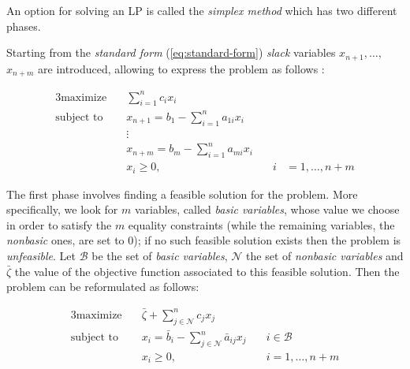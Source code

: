 An option for solving an \acrshort{LP} is called the \emph{simplex
	method} which has two different phases.

Starting from the \emph{standard form} (\autoref{eq:standard-form})
\emph{slack} variables $x_{n+1}, \dots, $ $x_{n+m} $ are introduced, allowing to express the problem as follows
\cite{Vanderbei2008,Edgar2001}:

\begin{alignat}{3}
	\label{eq:standard-form}
	\text{maximize}   \quad & \sum_{i=1}^{n} c_{i}x_{i}                                                                   \\
	\text{subject to} \quad & x_{n+1}                   = b_{1} - \sum_{i=1}^{n} a_{1i}  x_{i} &                          \\
	                        & \vdots                                                                                      \\
	                        & x_{n+m}                   = b_{m} - \sum_{i=1}^{n} a_{mi}  x_{i} &                          \\
	                        & x_{i}                     \geq 0,                                & \quad i & =1 ,\dots, n+m
\end{alignat}

The first phase involves finding a feasible solution for the problem. More
specifically, we look for $m$ variables, called \emph{basic variables}, whose
value we choose in order to satisfy the $m$ equality constraints (while the
remaining variables, the \emph{nonbasic} ones, are set to 0); if no such
feasible solution exists then the problem is \emph{unfeasible}. Let $\mathcal{B}
$ be the set of \emph{basic variables}, $\mathcal{N} $ the set of
\emph{nonbasic variables} \cite{Vanderbei2008,Bertsimas1997} and
$\bar{\zeta}$ the value of the objective function associated to this feasible
solution. Then the
problem can be reformulated as follows:

\begin{alignat}{3}
	\label{eq:standard-form-simplex-new}
	\text{maximize} \quad     & \bar{\zeta} + \sum_{j \in \mathcal{N} }^{n} c_{j}x_{j}                                           \\
	\text{subject to}   \quad & x_{i} = \bar{b}_{i} - \sum_{j \in \mathcal{N} }^{n} \bar{a}_{ij} x_{j} & \quad i \in \mathcal{B} \\
	                          & x_{i} \geq 0,                                                          & \quad i =1 ,\dots, n+m
\end{alignat}

